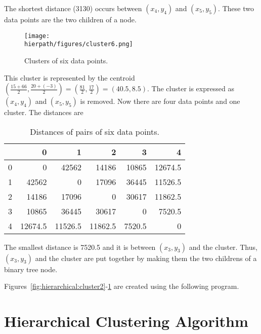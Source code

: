 The shortest distance (3130) occurs between $(x_4, y_4)$ and
$(x_5, y_5)$.  These two data points are the two children of a node.


\begin{figure}[h] \centering
{\texttt{[image: \\hierpath/figures/cluster6.png]}}
\caption{Clusters of six data points.}
\label{fig:hierarchical:cluster6}
\end{figure}

This cluster is represented by the centroid $(\frac{15 + 66}{2},
\frac{20 + (-3)}{2}) = (\frac{81}{2}, \frac{17}{2}) = (40.5, 8.5)$.
The cluster is expressed as $(x_4, y_4)$ and $(x_5, y_5)$ is removed.
Now there are four data points and one cluster. The distances
are

\begin{table}
  \begin{tt}
\begin{tabular}{|r|rrrrr|}  \hline
& 0 & 1 & 2 & 3 & 4  \\ \hline

0 & 0& 42562& 14186& 10865 & 12674.5\\
1 & 42562& 0& 17096& 36445 & 11526.5 \\
2 & 14186& 17096& 0& 30617 & 11862.5 \\
3 & 10865& 36445& 30617& 0 & 7520.5 \\
4 & 12674.5 & 11526.5 & 11862.5 & 7520.5 & 0 \\  \hline
\end{tabular}
  \end{tt}
  \caption{Distances of pairs of six data points.}
  \label{table:hierarchical:distance6points}
\end{table}

The smallest distance is 7520.5 and it is between $(x_3, y_3)$ and the
cluster. Thus, $(x_3, y_3)$ and the cluster are put together by making
them the two childrens of a binary tree node.

\clearpage

Figures~\ref{fig:hierarchical:cluster2}-\ref{fig:hierarchical:cluster6}
are created using the following program.

\resetlinenumber[1]
\linenumbers
\begin{tt}
  
\end{tt}
\nolinenumbers

\section{Hierarchical Clustering Algorithm}


